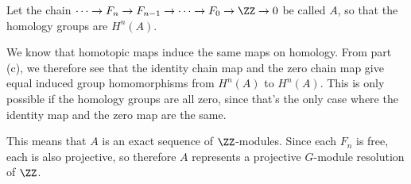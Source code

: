 \documentclass[12pt, reqno]{amsart}
\begin{document}
Let the chain $\cdots \to F_n \to F_{n-1} \to \cdots \to F_0 \to \ZZ \to 0$ be
called $A$, so that the homology groups are $H^n (A)$.

We know that homotopic maps induce the same maps on homology.
From part (c), we therefore see that the identity chain map and the zero chain
map give equal induced group homomorphisms from $H^n (A)$ to $H^n(A)$. This is
only possible if the homology groups are all zero, since that's the only case
where the identity map and the zero map are the same. 

This means that $A$ is an exact sequence of $\ZZ$-modules. Since each $F_n$ is
free, each is also projective, so therefore $A$ represents a projective
$G$-module resolution of $\ZZ$.
\end{document}
